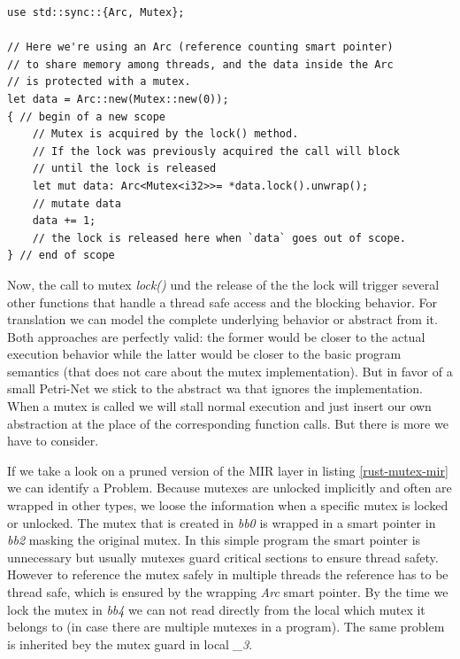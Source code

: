 \begin{lstlisting}
use std::sync::{Arc, Mutex};

// Here we're using an Arc (reference counting smart pointer)
// to share memory among threads, and the data inside the Arc
// is protected with a mutex.
let data = Arc::new(Mutex::new(0));
{ // begin of a new scope
    // Mutex is acquired by the lock() method.
    // If the lock was previously acquired the call will block
    // until the lock is released
    let mut data: Arc<Mutex<i32>>= *data.lock().unwrap();
    // mutate data
    data += 1;
    // the lock is released here when `data` goes out of scope.
} // end of scope
\end{lstlisting}

Now, the call to mutex \textit{lock()} und the release of the the lock will trigger several other functions that handle a thread safe access and the blocking behavior.
For translation we can model the complete underlying behavior or abstract from it.
Both approaches are perfectly valid: the former would be closer to the actual execution behavior while the latter would be closer to the basic program semantics (that does not care about the mutex implementation).
But in favor of a small Petri-Net we stick to the abstract wa that ignores the implementation.
When a mutex is called we will stall normal execution and just insert our own abstraction at the place of the corresponding function calls.
But there is more we have to consider.

If we take a look on a pruned version of the MIR layer in listing \ref{rust-mutex-mir} we can identify a Problem.
Because mutexes are unlocked implicitly and often are wrapped in other types, we loose the information when a specific mutex is locked or unlocked.
The mutex that is created in \textit{bb0} is wrapped in a smart pointer in \textit{bb2} masking the original mutex.
In this simple program the smart pointer is unnecessary but usually mutexes guard critical sections to ensure thread safety.
However to reference the mutex safely in multiple threads the reference has to be thread safe, which is ensured by the wrapping \textit{Arc} smart pointer.
By the time we lock the mutex in \textit{bb4} we can not read directly from the local which mutex it belongs to (in case there are multiple mutexes in a program).
The same problem is inherited bey the mutex guard in local \textit{\_3}.

